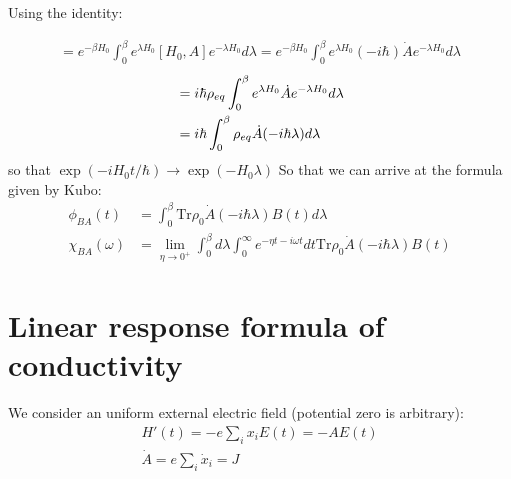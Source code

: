 \documentclass{article}
\begin{document}
Using the identity:

\begin{gather}
    [A, e^{-\beta H_0}] = e^{-\beta H_0} \int_0^{\beta} e^{\lambda H_0} [H_0, A] e^{-\lambda H_0} d\lambda 
    = e^{-\beta H_0} \int_0^{\beta} e^{\lambda H_0} (-i\hbar) \dot{A} e^{-\lambda H_0} d\lambda 
\end{gather}
\begin{align}
    [\rho_{eq}, A] &=  i\hbar \rho_{eq} \int_0^{\beta} e^{\lambda H_0} \dot{A} e^{-\lambda H_0} d\lambda \notag \\
                &=  i\hbar  \int_0^{\beta} \rho_{eq} \dot{A}(-i\hbar\lambda) d\lambda
\end{align}
so that $\exp(-iH_0t/\hbar) \to \exp( -H_0\lambda ) $
So that we can arrive at the formula given by Kubo:
\begin{align}
    \phi_{BA} (t) &= \int_0^{\beta} \text{Tr} \rho_0 \dot{A}(-i\hbar\lambda) B(t) d\lambda \\
    \chi_{BA}(\omega) &= 
    \lim_{\eta\to 0^+} \int_0^{\beta} d\lambda \int_{0}^{\infty} e^{-\eta t-i\omega t} dt \text{Tr} \rho_0 \dot{A}(-i\hbar\lambda) B(t)
\end{align}

\pagebreak
\section{Linear response formula of conductivity}
We consider an uniform external electric field (potential zero is arbitrary):
\begin{gather}
    H'(t) = -e \sum_i x_i E(t) = - A E(t) \\
    \dot{A} = e \sum_i \dot{x}_i = J
\end{gather}
\end{document}
